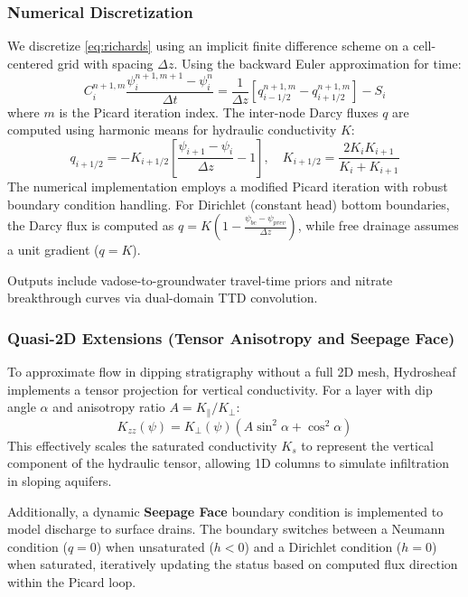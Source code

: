 \documentclass[12pt,a4paper]{article}
\theoremstyle{plain}
\theoremstyle{definition}
\theoremstyle{remark}
\begin{document}
\subsubsection{Numerical Discretization}
We discretize \eqref{eq:richards} using an implicit finite difference scheme on a cell-centered grid with spacing $\Delta z$. Using the backward Euler approximation for time:
\begin{equation}
	C_i^{n+1, m} \frac{\psi_i^{n+1, m+1} - \psi_i^n}{\Delta t} = \frac{1}{\Delta z} \left[ q_{i-1/2}^{n+1, m} - q_{i+1/2}^{n+1, m} \right] - S_i
\end{equation}
where $m$ is the Picard iteration index. The inter-node Darcy fluxes $q$ are computed using harmonic means for hydraulic conductivity $K$:
\begin{equation}
	q_{i+1/2} = -K_{i+1/2} \left[ \frac{\psi_{i+1} - \psi_i}{\Delta z} - 1 \right], \quad K_{i+1/2} = \frac{2 K_i K_{i+1}}{K_i + K_{i+1}}
\end{equation}
The numerical implementation employs a modified Picard iteration with robust boundary condition handling. For Dirichlet (constant head) bottom boundaries, the Darcy flux is computed as $q = K(1 - \frac{\psi_{bc} - \psi_{prev}}{\Delta z})$, while free drainage assumes a unit gradient ($q = K$).

Outputs include vadose-to-groundwater travel-time priors and nitrate breakthrough curves via dual-domain TTD convolution.

\subsubsection{Quasi-2D Extensions (Tensor Anisotropy and Seepage Face)}
To approximate flow in dipping stratigraphy without a full 2D mesh, Hydrosheaf implements a tensor projection for vertical conductivity. For a layer with dip angle $\alpha$ and anisotropy ratio $A = K_{\parallel}/K_{\perp}$:
\begin{equation}
	K_{zz}(\psi) = K_{\perp}(\psi) \left( A \sin^2 \alpha + \cos^2 \alpha \right)
\end{equation}
This effectively scales the saturated conductivity $K_s$ to represent the vertical component of the hydraulic tensor, allowing 1D columns to simulate infiltration in sloping aquifers.

Additionally, a dynamic \textbf{Seepage Face} boundary condition is implemented to model discharge to surface drains. The boundary switches between a Neumann condition ($q=0$) when unsaturated ($h < 0$) and a Dirichlet condition ($h=0$) when saturated, iteratively updating the status based on computed flux direction within the Picard loop.
\end{document}
